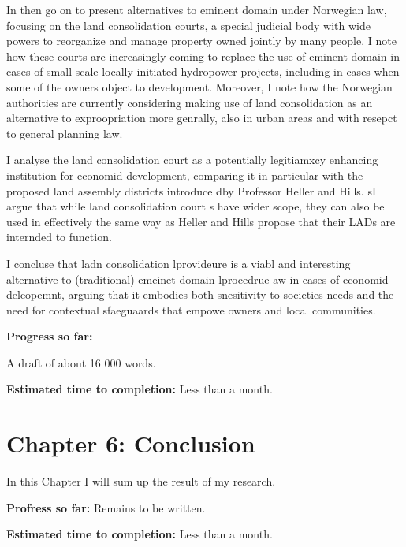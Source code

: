 \documentclass[12pt,a4paper]{article} %
\begin{document}
In then go on to present alternatives to eminent domain under Norwegian law, focusing on the land consolidation courts, a special judicial body with wide powers to reorganize and manage property owned jointly by many people. I note how these courts are increasingly coming to replace the use of eminent domain in cases of small scale locally initiated hydropower projects, including in cases when some of the owners object to development. Moreover, I note how the Norwegian authorities are currently considering making use of land consolidation as an alternative to exproopriation more genrally, also in urban areas and with resepct to general planning law. 

I analyse the land consolidation court as a potentially legitiamxcy enhancing institution for economid development, comparing it in particular with the proposed land assembly districts introduce dby Professor Heller and Hills. sI argue that while land consolidation court s have wider scope, they can also be used in effectively the same way as Heller and Hills propose that their LADs are internded to function. \cite{heller08}

I concluse that ladn consolidation lprovideure  is a viabl and interesting alternative to (traditional) emeinet domain lprocedrue aw in cases of economid deleopemnt, arguing that it embodies both snesitivity to societies needs and the need for contextual sfaeguaards that empowe owners and local communities.

{\bf Progress so far:}

A draft of about 16 000 words.

{\bf Estimated time to completion:} Less than a month.

\section*{Chapter 6: Conclusion}

In this Chapter I will sum up the result of my research.

{\bf Profress so far:} Remains to be written.


{\bf Estimated time to completion:} Less than a month.

\printbibliography
\end{document}
